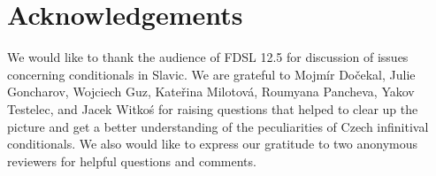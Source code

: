 \documentclass[output=paper,colorlinks,citecolor=brown,
modfonts,newtxmath
]{langscibook}
\begin{document}
\section*{Acknowledgements}

We would like to thank the audience of FDSL 12.5 for discussion of issues concerning conditionals in Slavic. We are grateful to Mojmír Dočekal, Julie Goncharov, Wojciech Guz, Kateřina Milotová, Roumyana Pancheva, Yakov Testelec, and Jacek Witkoś for raising questions that helped to clear up the picture and get a better understanding of the peculiarities of Czech infinitival conditionals. We also would like to express our gratitude to two anonymous reviewers for helpful questions and comments.

{\sloppy
\printbibliography[heading=subbibliography,notkeyword=this]
}
\end{document}
